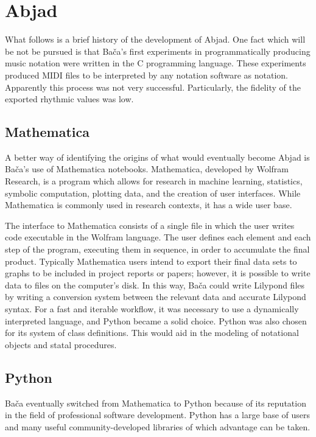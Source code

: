 \section{Abjad}

What follows is a brief history of the development of Abjad. One fact which will be not be pursued is that Ba\v{c}a's first experiments in programmatically producing music notation were written in the C programming language. These experiments produced \ac{MIDI} files to be interpreted by any notation software as notation. Apparently this process was not very successful. Particularly, the fidelity of the exported rhythmic values was low.

\subsection{Mathematica}

A better way of identifying the origins of what would eventually become Abjad is Ba\v{c}a's use of Mathematica notebooks. Mathematica, developed by Wolfram Research, is a program which allows for research in machine learning, statistics, symbolic computation, plotting data, and the creation of user interfaces. While Mathematica is commonly used in research contexts, it has a wide user base.

The interface to Mathematica consists of a single file in which the user writes code executable in the Wolfram language. The user defines each element and each step of the program, executing them in sequence, in order to accumulate the final product. Typically Mathematica users intend to export their final data sets to graphs to be included in project reports or papers; however, it is possible to write data to files on the computer's disk. In this way, Ba\v{c}a could write Lilypond files by writing a conversion system between the relevant data and accurate Lilypond syntax. For a fast and iterable workflow, it was necessary to use a dynamically interpreted language, and Python became a solid choice. Python was also chosen for its system of class definitions. This would aid in the modeling of notational objects and statal procedures.

\subsection{Python}

Ba\v{c}a eventually switched from Mathematica to Python because of its reputation in the field of professional software development. Python has a large base of users and many useful community-developed libraries of which advantage can be taken.


